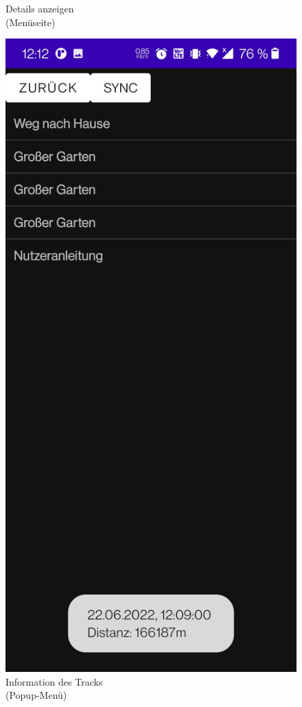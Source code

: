 \documentclass{article}
\begin{document}
\begin{figure}[H]
		  \centering
		  \caption{Details anzeigen \\(Menüseite)}
		\endminipage
		  \includegraphics[scale=0.15]{5_details2.jpg}
  		  \centering
		  \caption{Information des Tracks \\(Popup-Menü)}
		\endminipage
	\end{figure}
	\newpage
\end{document}
